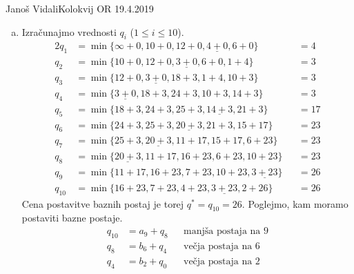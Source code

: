 \begin{naloga}{Janoš Vidali}{Kolokvij OR 19.4.2019}
\begin{odgovor}
\begin{enumerate}[(a)]
\item Izračunajmo vrednosti $q_i$ ($1 \le i \le 10$).
\begin{alignat*}{2}
q_1    &= \min\{\infty+0, 10+0, 12+0, \underline{4+0}, 6+0\}    &&= 4  \\
q_2    &= \min\{10+0, 12+0, \underline{3+0}, 6+0, 1+4\}         &&= 3  \\
q_3    &= \min\{12+0, \underline{3+0}, 18+3, 1+4, 10+3\}        &&= 3  \\
q_4    &= \min\{\underline{3+0}, 18+3, 24+3, 10+3, 14+3\}       &&= 3  \\
q_5    &= \min\{18+3, 24+3, 25+3, \underline{14+3}, 21+3\}      &&= 17 \\
q_6    &= \min\{24+3, 25+3, \underline{20+3}, 21+3, 15+17\}     &&= 23 \\
q_7    &= \min\{25+3, \underline{20+3}, 11+17, 15+17, 6+23\}    &&= 23 \\
q_8    &= \min\{\underline{20+3}, 11+17, 16+23, 6+23, 10+23\}   &&= 23 \\
q_9    &= \min\{11+17, 16+23, 7+23, 10+23, \underline{3+23}\}   &&= 26 \\
q_{10} &= \min\{16+23, 7+23, 4+23, \underline{3+23}, 2+26\}     &&= 26
\end{alignat*}
Cena postavitve baznih postaj je torej $q^* = q_{10} = 26$.
Poglejmo, kam moramo postaviti bazne postaje.
\begin{align*}
q_{10} &= a_9 + q_8 && \text{manjša postaja na $9$} \\
q_8    &= b_6 + q_4 && \text{večja postaja na $6$}  \\
q_4    &= b_2 + q_0 && \text{večja postaja na $2$}
\end{align*}
\end{enumerate}
\end{odgovor}
\end{naloga}
